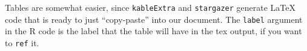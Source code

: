 \documentclass{article}
\begin{document}
Tables are somewhat easier, since \texttt{kableExtra} and \texttt{stargazer} generate LaTeX code that is ready to just ``copy-paste'' into our document. The \texttt{label} argument in the R code is the label that the table will have in the tex output, if you want to \texttt{ref} it.




\end{document}
